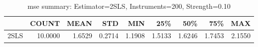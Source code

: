 \begin{table}[ht]
\centering
\caption{mse summary: Estimator=2SLS, Instruments=200, Strength=0.10}
\begin{tabular}{lrrrrrrrr}
\toprule
 & COUNT & MEAN & STD & MIN & 25\% & 50\% & 75\% & MAX \\
\midrule
2SLS & 10.0000 & 1.6529 & 0.2714 & 1.1908 & 1.5133 & 1.6246 & 1.7453 & 2.1550 \\
\bottomrule
\end{tabular}
\end{table}
